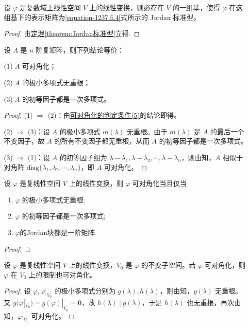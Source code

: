 \documentclass[../../main.tex]{subfiles}
\begin{document}
\begin{theorem}\label{theorem:线性变换一定有一个Jordan矩阵作为其表示矩阵}
设 $\varphi$ 是复数域上线性空间 $V$ 上的线性变换，则必存在 $V$ 的一组基，使得 $\varphi$ 在这组基下的表示矩阵为\eqref{equation-1237.6.4}式所示的 Jordan 标准型。
\end{theorem}
\begin{proof}
由\hyperref[theorem:Jordan标准型]{定理\ref{theorem:Jordan标准型}}立得.
\end{proof}

\begin{corollary}
设 $A$ 是 $n$ 阶复矩阵，则下列结论等价：

(1) $A$ 可对角化；

(2) $A$ 的极小多项式无重根；

(3) $A$ 的初等因子都是一次多项式。
\end{corollary}
\begin{proof}
(1) $\Rightarrow$ (2)：由\hyperref[theorem:可对角化的判定条件]{可对角化的判定条件(5)}的结论即得。

(2) $\Rightarrow$ (3)：设 $A$ 的极小多项式 $m(\lambda)$ 无重根。由于 $m(\lambda)$ 是 $A$ 的最后一个不变因子，故 $A$ 的所有不变因子都无重根，从而 $A$ 的初等因子都是一次多项式。

(3) $\Rightarrow$ (1)：设 $A$ 的初等因子组为 $\lambda - \lambda_1,\lambda - \lambda_2,\cdots,\lambda - \lambda_n$，则由知，$A$ 相似于对角阵 $\mathrm{diag}\{\lambda_1,\lambda_2,\cdots,\lambda_n\}$，即 $A$ 可对角化。
\end{proof}

\begin{corollary}\label{corollary:矩阵可对角化的几何叙述}
设 $\varphi$ 是复线性空间 $V$ 上的线性变换，则 $\varphi$ 可对角化当且仅当
\begin{enumerate}
\item $\varphi$ 的极小多项式无重根;

\item $\varphi$ 的初等因子都是一次多项式;

\item $\varphi$的Jordan块都是一阶矩阵.
\end{enumerate}
\end{corollary}
\begin{proof}

\end{proof}

\begin{corollary}\label{corollary:线性变换可对角化则其在不变子空间的限制上也可对角化}
设 $\varphi$ 是复线性空间 $V$ 上的线性变换，$V_0$ 是 $\varphi$ 的不变子空间。若 $\varphi$ 可对角化，则 $\varphi$ 在 $V_0$ 上的限制也可对角化。
\end{corollary}
\begin{proof}
设 $\varphi,\varphi|_{V_0}$ 的极小多项式分别为 $g(\lambda),h(\lambda)$，则由知，$g(\lambda)$ 无重根。又 $g(\varphi|_{V_0}) = g(\varphi)|_{V_0} = \mathbf{0}$，故 $h(\lambda)\mid g(\lambda)$，于是 $h(\lambda)$ 也无重根，再次由知，$\varphi|_{V_0}$ 可对角化。
\end{proof}
\end{document}
